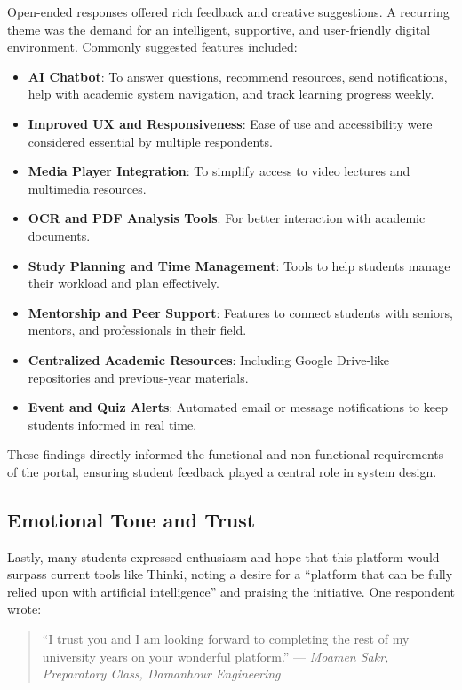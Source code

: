 Open-ended responses offered rich feedback and creative suggestions. A recurring theme was the demand for an intelligent, supportive, and user-friendly digital environment. Commonly suggested features included:

\begin{itemize}
\item \textbf{AI Chatbot}: To answer questions, recommend resources, send notifications, help with academic system navigation, and track learning progress weekly.
\item \textbf{Improved UX and Responsiveness}: Ease of use and accessibility were considered essential by multiple respondents.
\item \textbf{Media Player Integration}: To simplify access to video lectures and multimedia resources.
\item \textbf{OCR and PDF Analysis Tools}: For better interaction with academic documents.
\item \textbf{Study Planning and Time Management}: Tools to help students manage their workload and plan effectively.
\item \textbf{Mentorship and Peer Support}: Features to connect students with seniors, mentors, and professionals in their field.
\item \textbf{Centralized Academic Resources}: Including Google Drive-like repositories and previous-year materials.
\item \textbf{Event and Quiz Alerts}: Automated email or message notifications to keep students informed in real time.
\end{itemize}

These findings directly informed the functional and non-functional requirements of the portal, ensuring student feedback played a central role in system design.

\subsection*{Emotional Tone and Trust}

Lastly, many students expressed enthusiasm and hope that this platform would surpass current tools like Thinki, noting a desire for a ``platform that can be fully relied upon with artificial intelligence'' and praising the initiative. One respondent wrote:

\begin{quote}
``I trust you and I am looking forward to completing the rest of my university years on your wonderful platform.'' --- \textit{Moamen Sakr, Preparatory Class, Damanhour Engineering}
\end{quote}

